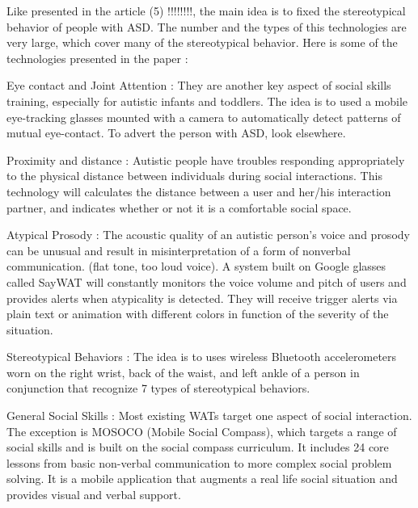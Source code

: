Like presented in the article (5) !!!!!!!!, the main idea is to fixed the stereotypical behavior of people with ASD. The number  and the types of this technologies are very large, which cover many of the stereotypical behavior. Here is some of the technologies presented in the paper :

Eye contact and Joint Attention : They are another key aspect of social skills training, especially for autistic infants and toddlers. The idea is to used a mobile eye-tracking glasses mounted with a camera to automatically detect patterns of mutual eye-contact. To advert the person with ASD, look elsewhere.

Proximity and distance : Autistic people have troubles responding appropriately to the physical distance between individuals during social interactions. This technology will calculates the distance between a user and her/his interaction partner, and indicates whether or not it is a comfortable social space. 

 Atypical Prosody : The acoustic quality of an autistic person’s voice and prosody can be unusual and result in misinterpretation of a form of nonverbal communication. (flat tone, too loud voice). A system built on Google glasses called SayWAT will constantly monitors the voice volume and pitch of users and provides alerts when atypicality is detected. They  will receive trigger alerts via plain text or animation with different colors in function of the severity of the situation.
 
Stereotypical Behaviors : The idea is to uses wireless Bluetooth accelerometers worn on the right wrist, back of the waist, and left ankle of a person in conjunction that recognize 7 types of stereotypical behaviors. 

General Social Skills : Most existing WATs target one aspect of social interaction. The exception is MOSOCO (Mobile Social Compass), which targets a range of social skills and is built on the social compass curriculum. It includes 24 core lessons from basic non-verbal communication to more complex social problem solving. It is a mobile application that augments a real life social situation and provides visual and verbal support.

